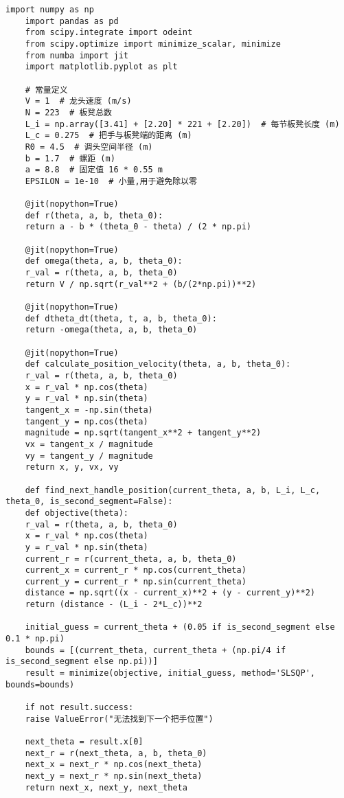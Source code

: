 
\begin{lstlisting}[caption={问题四处理代码}]
	import numpy as np
	import pandas as pd
	from scipy.integrate import odeint
	from scipy.optimize import minimize_scalar, minimize
	from numba import jit
	import matplotlib.pyplot as plt
	
	# 常量定义
	V = 1  # 龙头速度 (m/s)
	N = 223  # 板凳总数
	L_i = np.array([3.41] + [2.20] * 221 + [2.20])  # 每节板凳长度 (m)
	L_c = 0.275  # 把手与板凳端的距离 (m)
	R0 = 4.5  # 调头空间半径 (m)
	b = 1.7  # 螺距 (m)
	a = 8.8  # 固定值 16 * 0.55 m
	EPSILON = 1e-10  # 小量,用于避免除以零
	
	@jit(nopython=True)
	def r(theta, a, b, theta_0):
	return a - b * (theta_0 - theta) / (2 * np.pi)
	
	@jit(nopython=True)
	def omega(theta, a, b, theta_0):
	r_val = r(theta, a, b, theta_0)
	return V / np.sqrt(r_val**2 + (b/(2*np.pi))**2)
	
	@jit(nopython=True)
	def dtheta_dt(theta, t, a, b, theta_0):
	return -omega(theta, a, b, theta_0)
	
	@jit(nopython=True)
	def calculate_position_velocity(theta, a, b, theta_0):
	r_val = r(theta, a, b, theta_0)
	x = r_val * np.cos(theta)
	y = r_val * np.sin(theta)
	tangent_x = -np.sin(theta)
	tangent_y = np.cos(theta)
	magnitude = np.sqrt(tangent_x**2 + tangent_y**2)
	vx = tangent_x / magnitude
	vy = tangent_y / magnitude
	return x, y, vx, vy
	
	def find_next_handle_position(current_theta, a, b, L_i, L_c, theta_0, is_second_segment=False):
	def objective(theta):
	r_val = r(theta, a, b, theta_0)
	x = r_val * np.cos(theta)
	y = r_val * np.sin(theta)
	current_r = r(current_theta, a, b, theta_0)
	current_x = current_r * np.cos(current_theta)
	current_y = current_r * np.sin(current_theta)
	distance = np.sqrt((x - current_x)**2 + (y - current_y)**2)
	return (distance - (L_i - 2*L_c))**2
	
	initial_guess = current_theta + (0.05 if is_second_segment else 0.1 * np.pi)
	bounds = [(current_theta, current_theta + (np.pi/4 if is_second_segment else np.pi))]
	result = minimize(objective, initial_guess, method='SLSQP', bounds=bounds)
	
	if not result.success:
	raise ValueError("无法找到下一个把手位置")
	
	next_theta = result.x[0]
	next_r = r(next_theta, a, b, theta_0)
	next_x = next_r * np.cos(next_theta)
	next_y = next_r * np.sin(next_theta)
	return next_x, next_y, next_theta
	

\end{lstlisting}
